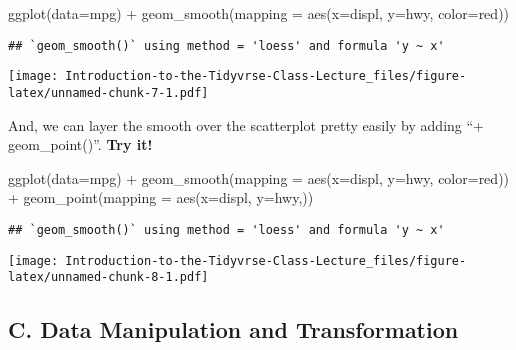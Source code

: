\documentclass[
]{article}
\newenvironment{Shaded}{\begin{snugshade}}{\end{snugshade}}
\newcommand{\AttributeTok}[1]{\textcolor[rgb]{0.77,0.63,0.00}{#1}}
\newcommand{\FunctionTok}[1]{\textcolor[rgb]{0.00,0.00,0.00}{#1}}
\newcommand{\NormalTok}[1]{#1}
\newcommand{\SpecialCharTok}[1]{\textcolor[rgb]{0.00,0.00,0.00}{#1}}
\newcommand{\StringTok}[1]{\textcolor[rgb]{0.31,0.60,0.02}{#1}}
\begin{document}
\begin{Shaded}
\begin{Highlighting}[]
\FunctionTok{ggplot}\NormalTok{(}\AttributeTok{data=}\NormalTok{mpg) }\SpecialCharTok{+} \FunctionTok{geom\_smooth}\NormalTok{(}\AttributeTok{mapping =} \FunctionTok{aes}\NormalTok{(}\AttributeTok{x=}\NormalTok{displ, }\AttributeTok{y=}\NormalTok{hwy, }\AttributeTok{color=}\StringTok{\textquotesingle{}red\textquotesingle{}}\NormalTok{))}
\end{Highlighting}
\end{Shaded}

\begin{verbatim}
## `geom_smooth()` using method = 'loess' and formula 'y ~ x'
\end{verbatim}

\texttt{[image: Introduction-to-the-Tidyvrse-Class-Lecture\_files/figure-latex/unnamed-chunk-7-1.pdf]}

And, we can layer the smooth over the scatterplot pretty easily by
adding ``+ geom\_point()''. \textbf{Try it!}

\begin{Shaded}
\begin{Highlighting}[]
\FunctionTok{ggplot}\NormalTok{(}\AttributeTok{data=}\NormalTok{mpg) }\SpecialCharTok{+} \FunctionTok{geom\_smooth}\NormalTok{(}\AttributeTok{mapping =} \FunctionTok{aes}\NormalTok{(}\AttributeTok{x=}\NormalTok{displ, }\AttributeTok{y=}\NormalTok{hwy, }\AttributeTok{color=}\StringTok{\textquotesingle{}red\textquotesingle{}}\NormalTok{)) }\SpecialCharTok{+} \FunctionTok{geom\_point}\NormalTok{(}\AttributeTok{mapping =} \FunctionTok{aes}\NormalTok{(}\AttributeTok{x=}\NormalTok{displ, }\AttributeTok{y=}\NormalTok{hwy,))}
\end{Highlighting}
\end{Shaded}

\begin{verbatim}
## `geom_smooth()` using method = 'loess' and formula 'y ~ x'
\end{verbatim}

\texttt{[image: Introduction-to-the-Tidyvrse-Class-Lecture\_files/figure-latex/unnamed-chunk-8-1.pdf]}

\hypertarget{c.-data-manipulation-and-transformation}{%
\subsection{C. Data Manipulation and
Transformation}\label{c.-data-manipulation-and-transformation}}
\end{document}
